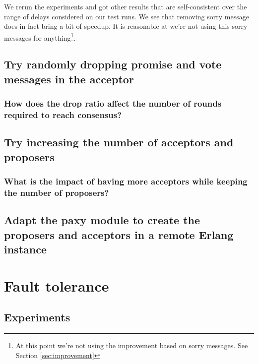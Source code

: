 \documentclass[a4paper, 10pt]{article}
\begin{document}
We rerun the experiments and got other results that are self-consistent over the range of delays considered on our test runs. We see that removing sorry message does in fact bring a bit of speedup. It is reasonable at we're not using this sorry messages for anything\footnote{At this point we're not using the improvement based on sorry messages. See Section \ref{sec:improvement}}.



\subsection{Try randomly dropping promise and vote messages in the acceptor}

\subsubsection{How does the drop ratio affect the number of rounds required to reach consensus?}

\subsection{Try increasing the number of acceptors and proposers}

\subsubsection{What is the impact of having more acceptors while keeping the number of proposers?}

\subsection{Adapt the paxy module to create the proposers and acceptors in a remote Erlang instance}



\section{Fault tolerance}

\subsection{Experiments}
\end{document}
